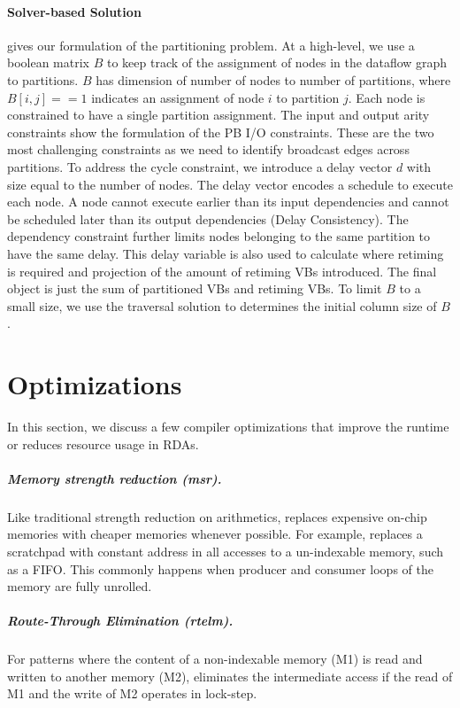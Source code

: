 \paragraph{Solver-based Solution}
 gives our formulation of the partitioning problem.
At a high-level, we use a boolean matrix $B$ to keep track of the assignment of nodes in the dataflow graph to partitions. 
$B$ has dimension of number of nodes to number of partitions, where$B[i,j]==1$ indicates an assignment of node $i$ to partition $j$. 
Each node is constrained to have a single partition assignment.
The input and output arity constraints show the formulation of the PB I/O constraints.
These are the two most challenging constraints as we need to identify broadcast edges across partitions.
To address the cycle constraint, we introduce a delay vector $d$ with size equal to the number of nodes. 
The delay vector encodes a schedule to execute each node. 
A node cannot execute earlier than its input dependencies and cannot be scheduled later than its output dependencies (Delay Consistency).
The dependency constraint further limits nodes belonging to the same partition to have the same delay.
This delay variable is also used to calculate where retiming is required and projection of the amount of retiming VBs introduced. 
The final object is just the sum of partitioned VBs and retiming VBs.
To limit $B$ to a small size, we use the traversal solution to determines the initial column size of $B$.

\section{Optimizations}\label{sec:opt}
In this section, we discuss a few compiler optimizations that improve the runtime or reduces resource usage in RDAs.

\subparagraph{Memory strength reduction (msr).} Like traditional strength reduction on arithmetics, \name{} replaces expensive on-chip memories with cheaper memories whenever possible.
For example, \name{} replaces a scratchpad with constant address in all accesses to a un-indexable memory, such as a FIFO.
This commonly happens when producer and consumer loops of the memory are fully unrolled.

\subparagraph{Route-Through Elimination (rtelm).} For patterns where the content of a non-indexable memory  (M1) is read and written to another memory (M2), \name{} eliminates the intermediate access if the read of M1 and the write of M2 operates in lock-step.

